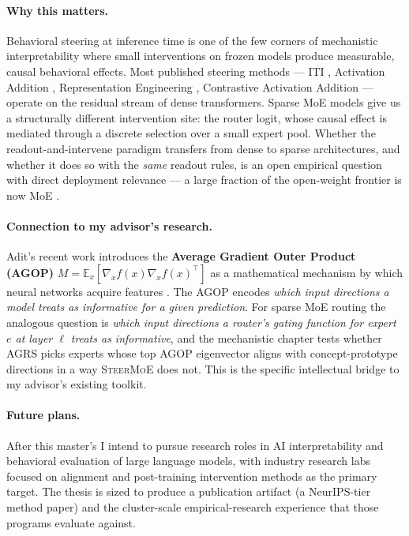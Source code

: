 \documentclass[11pt]{article}
\begin{document}
\paragraph{Why this matters.}
Behavioral steering at inference time is one of the few corners of
mechanistic interpretability where small interventions on frozen
models produce measurable, causal behavioral effects. Most published
steering methods --- \textsc{ITI} \citep{li2023iti}, Activation
Addition \citep{turner2023activation}, Representation Engineering
\citep{zou2023repe}, Contrastive Activation Addition
\citep{panickssery2024steering} --- operate on the residual stream of
dense transformers. Sparse MoE models give us a structurally
different intervention site: the router logit, whose causal effect is
mediated through a discrete selection over a small expert pool.
Whether the readout-and-intervene paradigm transfers from dense to
sparse architectures, and whether it does so with the \emph{same}
readout rules, is an open empirical question with direct deployment
relevance --- a large fraction of the open-weight frontier is now MoE
\citep{jiang2024mixtral, muennighoff2024olmoe}.

\paragraph{Connection to my advisor's research.}
Adit's recent work introduces the \textbf{Average Gradient Outer
Product (AGOP)}
$M = \mathbb{E}_x[\nabla_x f(x) \nabla_x f(x)^\top]$ as a mathematical
mechanism by which neural networks acquire features
\citep{radhakrishnan2024mechanism, beaglehole2024mechanism,
radhakrishnan2024rfm}. The AGOP encodes \emph{which input directions
a model treats as informative for a given prediction}. For sparse MoE
routing the analogous question is \textit{which input directions a
router's gating function for expert $e$ at layer $\ell$ treats as
informative}, and the mechanistic chapter tests whether AGRS picks
experts whose top AGOP eigenvector aligns with concept-prototype
directions in a way \textsc{SteerMoE} does not. This is the specific
intellectual bridge to my advisor's existing toolkit.

\paragraph{Future plans.}
After this master's I intend to pursue research roles in AI
interpretability and behavioral evaluation of large language models,
with industry research labs focused on alignment and post-training
intervention methods as the primary target. The thesis is sized to
produce a publication artifact (a NeurIPS-tier method paper) and the
cluster-scale empirical-research experience that those programs
evaluate against.
\end{document}
